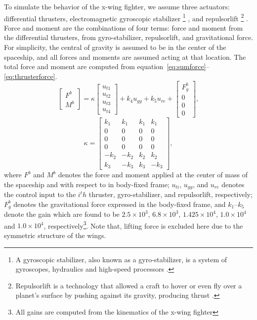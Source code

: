 To simulate the behavior of the x-wing fighter, we assume three actuators: differential thrusters, electromagnetic gyroscopic stabilizer \footnote{A gyroscopic stabilizer, also known as a gyro-stabilizer, is a system of gyroscopes, hydraulics and high-speed processors \cite{gyros}.} \cite{gyros}, and repulsorlift \footnote{Repulsorlift is a technology that allowed a craft to hover or even fly over a planet's surface by pushing against its gravity, producing thrust \cite{repulsorlift}.} \cite{repulsorlift}. Force and moment are the combinations of four terms: force and moment from the differential thrusters, from gyro-stabilizer, repulsorlift, and gravitational force. For simplicity, the central of gravity is assumed to be in the center of the spaceship, and all forces and moments are assumed acting at that location. The total force and moment are computed from equation~\ref{eq:sumforce}–\ref{eq:thrusterforce}.
\begin{equation}
\begin{bmatrix} F^b \\ M^b \end{bmatrix} = \kappa
\begin{bmatrix} u_{t1} \\ u_{t2} \\ u_{t3} \\ u_{t4} \end{bmatrix}
+ k_4 u_{gy} + k_5 u_{re} + \begin{bmatrix} F_g^b \\ 0 \\ 0 \\ 0 \end{bmatrix},
\label{eq:sumforce}
\end{equation}
\begin{equation}
\kappa = \begin{bmatrix} k_1 & k_1 & k_1 & k_1\\
0 & 0 & 0 & 0 \\
0 & 0 & 0 & 0 \\
0 & 0 & 0 & 0 \\
-k_2 & -k_2 & k_2 & k_2 \\
k_3 & -k_3 & k_3 & -k_3 
\end{bmatrix},
\label{eq:thrusterforce}
\end{equation}
where $F^b$ and $M^b$ denotes the force and moment applied at the center of mass of the spaceship and with respect to in body-fixed frame; $u_{ti}$, $u_{gy}$, and $u_{re}$ denotes the control input to the $i^th$ thruster, gyro-stabilizer, and repulsorlift, respectively; $F^b_g$ denotes the gravitational force expressed in the body-fixed frame, and $k_1$–$k_5$ denote the gain which are found to be $2.5\times10^3$, $6.8\times10^3$, $1.425\times10^4$, $1.0\times10^4$ and $1.0\times10^4$, respectively\footnote{All gains are computed from the kinematics of the x-wing fighter}. Note that, lifting force is excluded here due to the symmetric structure of the wings.

